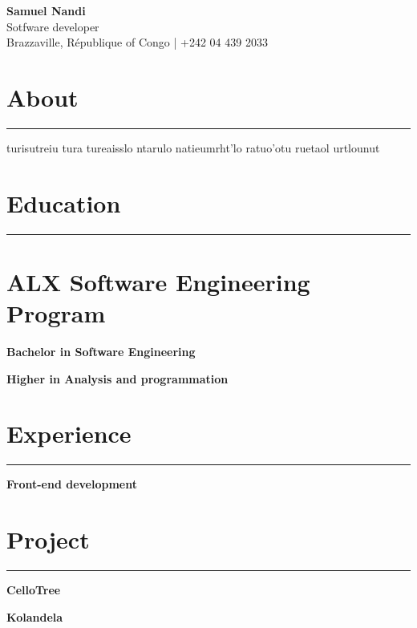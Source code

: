 \documentclass[12pt]{extarticle}
\begin{document}
\large {
  \textbf{ Samuel Nandi } \\
    Sotfware developer \\
  Brazzaville, République of Congo | +242 04 439 2033
}


\section*{About}
\hrule

turisutreiu tura tureaisslo ntarulo natieumrht'lo ratuo'otu  ruetaol urtlounut

\section*{Education}
\hrule

\section{
  \textbf{ ALX Software Engineering Program }
}

\large{
  \textbf{Bachelor in Software Engineering}
}

\large{
  \textbf{Higher in Analysis and programmation}
}

\section*{ Experience }
\hrule

\large{
  \textbf{Front-end development}
}

\section*{ Project }
\hrule

\large{
  \textbf{CelloTree}
}


\large{
  \textbf{Kolandela}
}
\end{document}
